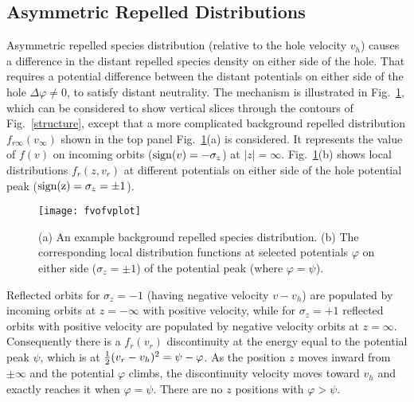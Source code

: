 \documentclass[aip,pop,article-title]{revtex4-2}
\begin{document}
\subsection{Asymmetric Repelled Distributions}


Asymmetric repelled species distribution (relative to the hole
velocity $v_h$) causes a difference in the distant repelled species
density on either side of the hole.  That requires a potential
difference between the distant potentials on either side of the hole
$\Delta\varphi\not=0$, to satisfy distant
neutrality\cite{Hutchinson2021d}. The mechanism is illustrated in
Fig.\ \ref{fvofvplot}, which can be considered to show vertical slices
through the contours of Fig.\ \ref{structure}, except that a more
complicated background repelled distribution $f_{r\infty}(v_\infty)$ shown in the top panel
Fig.\ \ref{fvofvplot}(a) is considered. It represents the value of
$f(v)$ on incoming orbits (${\rm sign}(v)=-\sigma_z$) at
$|z|=\infty$. Fig.\ \ref{fvofvplot}(b) shows local distributions
$f_r(z,v_r)$ at different potentials on either side of the hole
potential peak (${\rm sign(z)}=\sigma_z=\pm1$).
\begin{figure}[htp]
\centering
  \texttt{[image: fvofvplot]}
  \caption{(a) An example background repelled species
    distribution. (b) The corresponding local distribution functions at
    selected potentials $\varphi$ on either side ($\sigma_z=\pm1$) of the
    potential peak (where $\varphi=\psi$). \label{fvofvplot}}
\end{figure}
Reflected orbits for $\sigma_z=-1$ (having negative velocity $v-v_h$)
are populated by incoming orbits at $z=-\infty$ with positive
velocity, while for $\sigma_z=+1$ reflected orbits with positive
velocity are populated by negative velocity orbits at
$z=\infty$. Consequently there is a $f_r(v_r)$ discontinuity at the
energy equal to the potential peak $\psi$, which is at
${1\over2}(v_r-v_h)^2=\psi-\varphi$. As the position $z$ moves inward
from $\pm\infty$ and the potential $\varphi$ climbs, the discontinuity velocity moves
toward $v_h$ and exactly reaches it when $\varphi=\psi$. There are
no $z$ positions with $\varphi>\psi$. 
\end{document}
